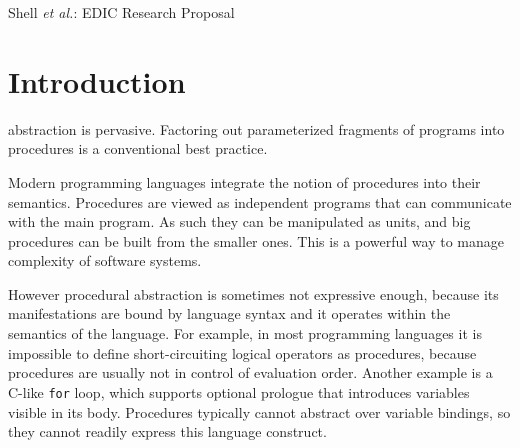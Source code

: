 \documentclass[10pt,journal,a4paper]{IEEEtran}
\begin{document}
%
{Shell \MakeLowercase{\textit{et al.}}: EDIC Research Proposal}


\maketitle
\IEEEdisplaynotcompsoctitleabstractindextext
\IEEEpeerreviewmaketitle

\section{Introduction}

 abstraction is pervasive.
Factoring out parameterized fragments of programs into procedures
is a conventional best practice.

Modern programming languages integrate the notion of procedures into their semantics.
Procedures are viewed as independent programs that can communicate with the main program.
As such they can be manipulated as units, and big procedures can be built from the smaller ones.
This is a powerful way to manage complexity of software systems.

However procedural abstraction is sometimes not expressive enough, because
its manifestations are bound by language syntax and it operates within the semantics
of the language.
For example, in most programming languages it is impossible to define short-circuiting logical operators
as procedures, because procedures are usually not in control of evaluation order.
Another example is a C-like \small \texttt{for} \normalsize loop, which supports
optional prologue that introduces variables visible in its body. Procedures typically cannot abstract
over variable bindings, so they cannot readily express this language construct.
\end{document}

